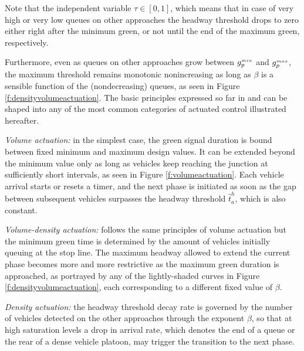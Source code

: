 Note that the independent variable $\tau \in [0,1]$, which means that in case of very high or very
low queues on other approaches the headway threshold drops to zero either right after the minimum
green, or not until the end of the maximum green, respectively.

Furthermore, even as queues on other approaches grow between $g_{p}^{\scriptscriptstyle{min}}$ and $g_{p}^{\scriptscriptstyle{max}}$, the
maximum threshold remains monotonic nonincreasing as long as $\beta$ is a sensible function of
the (nondecreasing) queues, as seen in Figure \ref{f:densityvolumeactuation}. The basic principles expressed so far in  and  can be shaped into any of the most
common categories of actuated control illustrated hereafter.

\textit{Volume actuation:} in the simplest case, the green signal duration is bound between fixed
minimum and maximum design values. It can be extended beyond the minimum value only as
long as vehicles keep reaching the junction at sufficiently short intervals, as seen in Figure \ref{f:volumeactuation}.
Each vehicle arrival starts or resets a timer, and the next phase is initiated as soon as the gap
between subsequent vehicles surpasses the headway threshold $\hat{t}_a^{h}$, which is also constant.

\textit{Volume-density actuation:} follows the same principles of volume actuation but the
minimum green time is determined by the amount of vehicles initially queuing at the stop
line. The maximum headway allowed to extend the current phase becomes more and more restrictive as the maximum green duration is approached, as portrayed by any of the lightly-shaded curves in Figure \ref{f:densityvolumeactuation}, each corresponding to a different fixed value of $\beta$.

\textit{Density actuation:} the headway threshold decay rate is governed by the number of vehicles detected on the other approaches through the exponent $\beta$, so that at high saturation levels a drop in arrival rate, which denotes the end of a queue or the rear of a dense vehicle platoon, may trigger the transition to the next phase.

